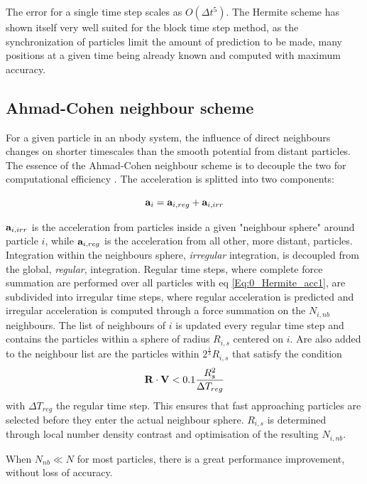 The error for a single time step scales as $O(\Delta t^5)$. The Hermite scheme has shown itself very well suited for the block time step method, as the synchronization of particles limit the amount of prediction to be made, many positions at a given time being already known and computed with maximum accuracy.


\subsection{Ahmad-Cohen neighbour scheme}

For a given particle in an nbody system, the influence of direct neighbours changes on shorter timescales than the smooth potential from distant particles. The essence of the Ahmad-Cohen neighbour scheme is to decouple the two for computational efficiency \citep{AhmadCohen1973}. The acceleration is splitted into two components:

\begin{equation}
\bold{a}_i = \bold{a}_{i,reg} + \bold{a}_{i,irr}
\end{equation}

$\bold{a}_{i,irr}$ is the acceleration from particles inside a given "neighbour sphere" around particle $i$, while $\bold{a}_{i,reg}$ is the acceleration from all other, more distant, particles. Integration within the neighbours sphere,  \textit{irregular} integration, is decoupled from the global, \textit{regular}, integration. Regular time steps, where complete force summation are performed over all particles with eq \ref{Eq:0_Hermite_acc1}, are subdivided into irregular time steps, where regular acceleration is predicted and irregular acceleration is computed through a force summation on the $N_{i,nb}$ neighbours. The list of neighbours of $i$ is updated every regular time step and contains the particles within a sphere of radius $R_{i,s}$ centered on $i$. Are also added to the neighbour list are the particles within $2^{\frac{1}{3}}R_{i,s} $ that satisfy the condition
\begin{equation}
\bold{R} \cdot \bold{V} < 0.1 \frac{R_s^2}{\Delta T_{reg}}
\end{equation}
with $\Delta T_{reg}$ the regular time step. This ensures that fast approaching particles are selected before they enter the actual neighbour sphere. $R_{i,s}$ is determined through local number density contrast and optimisation of the resulting $N_{i,nb}$. 

When $N_{nb} \ll N$ for most particles, there is a great performance improvement, without loss of accuracy. 












